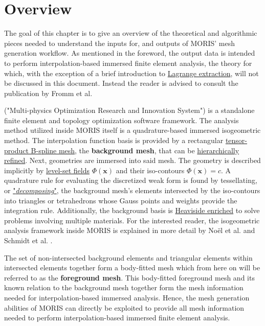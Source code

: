\chapter{Overview}
\label{sec:overview}

The goal of this chapter is to give an overview of the theoretical and algorithmic pieces needed to understand the inputs for, and outputs of MORIS' mesh generation workflow.
As mentioned in the foreword, the output data is intended to perform interpolation-based immersed finite element analysis, the theory for which, with the exception of a brief introduction to \hyperref[sec:overview_extraction]{Lagrange extraction}, will not be discussed in this document. Instead the reader is advised to consult the publication by Fromm et al. \cite{Fromm2022}

 ("Multi-physics Optimization Research and Innovation System") is a standalone finite element and topology optimization software framework. The analysis method utilized inside MORIS itself is a quadrature-based immersed isogeometric method. The interpolation function basis is provided by a rectangular \hyperref[sec:overview_background]{tensor-product B-spline mesh}, the \textbf{background mesh}, that can be \hyperlink{hierarchical_refinement}{hierarchically refined}. Next, geometries are immersed into said mesh. The geometry is described implicitly by \hyperref[sec:overview_geometry]{level-set fields} $\Phi(\bm{x})$ and their iso-contours  $\Phi(\bm{x}) = c$. A quadrature rule for evaluating the discretized weak form is found by tessellating, or \hyperlink{decomposition}{"\emph{decomposing}"}, the background mesh's elements intersected by the iso-contours into triangles or tetrahedrons whose Gauss points and weights provide the integration rule. Additionally, the background basis is \hyperlink{enrichment}{Heaviside enriched} to solve problems involving multiple materials. For the interested reader, the isogeometric analysis framework inside MORIS is explained in more detail by No\"el et al. \cite{Noel2022} and Schmidt et al. \cite{Schmidt2022}.

The set of non-intersected background elements and triangular elements within intersected elements together form a body-fitted mesh which from here on will be referred to as the \textbf{foreground mesh}. This body-fitted foreground mesh and its known relation to the background mesh together form the mesh information needed for interpolation-based immersed analysis. Hence, the mesh generation abilities of MORIS can directly be exploited to provide all mesh information needed to perform interpolation-based immersed finite element analysis.

